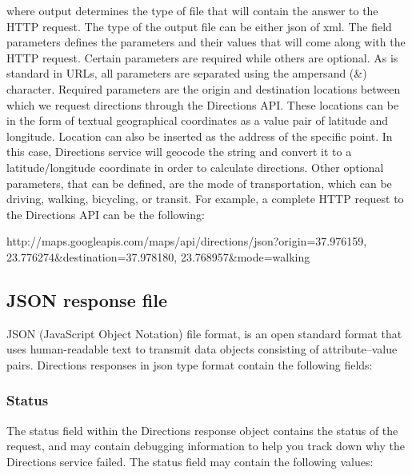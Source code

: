 where output determines the type of file that will contain the answer to the HTTP request. The type of the output file can be either json of xml. 
The field parameters 
defines the parameters and their values that will come along with the HTTP request. Certain parameters are required while others are optional. As is standard 
in URLs, all parameters are separated using the ampersand (\&) character. Required parameters are the origin and destination locations between which we 
request directions through the Directions API. These locations can be in the form of textual geographical coordinates as a value pair of latitude and 
longitude. Location can also be inserted as the address of the specific point. In this case, Directions service will geocode the string and convert it to 
a latitude/longitude coordinate in order to calculate directions. Other optional parameters, that can be defined, are the mode of transportation, 
which can be driving, walking, bicycling, or transit. For example, a complete HTTP request to the Directions API can be the following:

\begin{center}
 http://maps.googleapis.com/maps/api/directions/json?origin=37.976159, 23.776274\&destination=37.978180, 23.768957\&mode=walking
\end{center}

\subsection{JSON response file}

JSON (JavaScript Object Notation) file format, is an open standard format that uses human-readable text to transmit data objects consisting of attribute–value pairs. 
Directions responses in json type format contain the following fields: 

\subsubsection{Status}

The status field within the Directions response object contains the status of the request, and may contain debugging information to help you track down why 
the Directions service failed. The status field may contain the following values:

